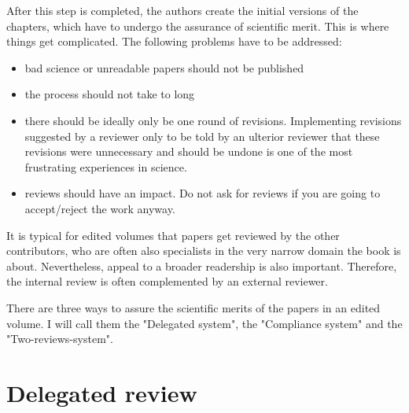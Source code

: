 \documentclass[border=20pt]{article}
\begin{document}
After this step is completed, the authors create the initial versions of
the chapters, which have to undergo the assurance of scientific merit.
This is where things get complicated. The following problems have to be
addressed:

\begin{itemize}
 \item  bad science or unreadable papers should not be published
 \item  the process should not take to long
 \item  there should be ideally only be one round of revisions. Implementing revisions suggested by a reviewer only to be told by an ulterior reviewer that these revisions were unnecessary and should be undone is one of the most frustrating experiences in science.
 \item  reviews should have an impact. Do not ask for reviews if you are going to accept/reject the work anyway.
\end{itemize}

It is typical for edited volumes that papers get reviewed by the other
contributors, who are often also specialists in the very narrow domain the book is about. Nevertheless, appeal to a broader readership is also important. Therefore, the internal review is often complemented by an external reviewer.

There are three ways to assure the scientific merits of the papers in an edited volume. I will call them the "Delegated system", the "Compliance system" and the "Two-reviews-system".

\section*{Delegated review}
\end{document}
